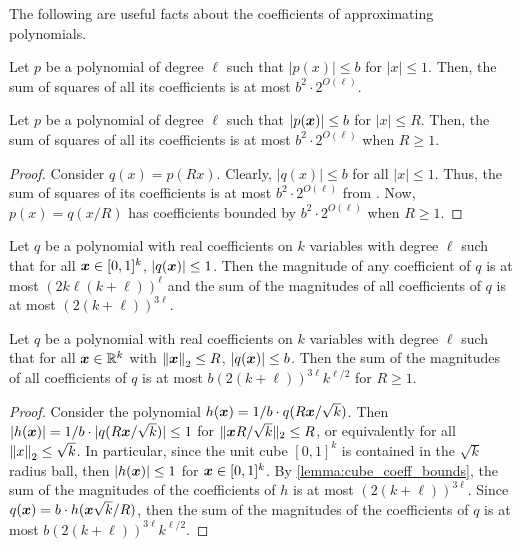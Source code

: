 The following are useful facts about the coefficients of approximating polynomials.
\begin{fact}
\label{lem:uni_poly_unit_coeff_bound}
    Let $p$ be a polynomial of degree $\ell$ such that $|p(x)|\leq b$ for $|x|\leq 1$. Then, the sum of squares of all its coefficients is at most $b^2\cdot 2^{O(\ell)}$.
\end{fact}
\begin{lemma}
\label{lem:uni_poly_coeff_bound}
 Let $p$ be a polynomial of degree $\ell$ such that $|p({\bm{x}})|\leq b$ for $|x|\leq R$. Then, the sum of squares of all its coefficients is at most $b^2\cdot 2^{O(\ell)}$ when $R\geq 1$.
\end{lemma}
\begin{proof}
    Consider $q(x)=p(Rx)$. Clearly, $|q(x)|\leq b$ for all $|x|\leq 1$. Thus, the sum of squares of its coefficients is at most $b^2\cdot 2^{O(\ell)}$ from . Now, $p(x)=q(x/R)$ has coefficients bounded by $b^2\cdot 2^{O(\ell)}$ when $R\geq 1$.
\end{proof}
\begin{fact}\label{lemma:cube_coeff_bounds}
    Let $q$ be a polynomial with real coefficients on $k$ variables with degree $\ell$ such that for all ${\bm{x}} \in [0, 1]^k$, $|q({\bm{x}})| \le 1$. Then the magnitude of any coefficient of $q$ is at most $(2k\ell(k+\ell))^{\ell}$ and the sum of the magnitudes of all coefficients of $q$ is at most $(2(k+\ell))^{3\ell}$.
\end{fact}
\begin{lemma}\label{lemma:ball_coeff_bounds}
    Let $q$ be a polynomial with real coefficients on $k$ variables with degree $\ell$ such that for all ${\bm{x}} \in \mathbb{R}^k$ with $\left\| {\bm{x}} \right\|_2 \le R$, $|q({\bm{x}})| \le b$. Then the sum of the magnitudes of all coefficients of $q$ is at most $b(2(k+\ell))^{3\ell}k^{\ell/2}$ for $R\geq 1$.
\end{lemma}
\begin{proof}
    Consider the polynomial $h({\bm{x}}) = 1/b \cdot q(R{\bm{x}}/\sqrt{k})$. Then $|h({\bm{x}})| = 1/b \cdot |q(R{\bm{x}}/\sqrt{k})| \le 1$ for $\|{\bm{x}} R/\sqrt{k}\|_2 \le R$, or equivalently for all $\left\| x \right\|_2 \le \sqrt{k}$. In particular, since the unit cube $[0,1]^k$ is contained in the $\sqrt{k}$ radius ball, then $|h({\bm{x}})| \le 1$ for ${\bm{x}} \in [0,1]^k$. By \cref{lemma:cube_coeff_bounds}, the sum of the magnitudes of the coefficients of $h$ is at most $(2(k+\ell))^{3\ell}$. Since $q({\bm{x}}) = b \cdot h({\bm{x}}\sqrt{k}/R)$, then the sum of the magnitudes of the coefficients of $q$ is at most $b(2(k + \ell))^{3\ell} k^{\ell/2}$.
\end{proof}

